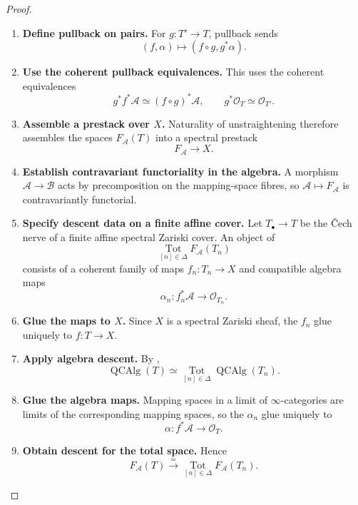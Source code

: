 \begin{proof}
\begin{enumerate}[label=\textup{(\arabic*)}]
    \item \textbf{Define pullback on pairs.}
    For \(g:T'\to T\), pullback sends
    \[
        (f,\alpha)
        \longmapsto
        (f\circ g,g^*\alpha).
    \]

    \item \textbf{Use the coherent pullback equivalences.}
    This uses the coherent equivalences
    \[
        g^*f^*\mathcal A\simeq(f\circ g)^*\mathcal A,
        \qquad
        g^*\mathcal O_T\simeq\mathcal O_{T'}.
    \]

    \item \textbf{Assemble a prestack over \(X\).}
    Naturality of unstraightening therefore assembles the spaces
    \(F_{\mathcal A}(T)\) into a spectral prestack
    \[
        F_{\mathcal A}\longrightarrow X.
    \]

    \item \textbf{Establish contravariant functoriality in the algebra.}
    A morphism \(\mathcal A\to\mathcal B\) acts by precomposition on the
    mapping-space fibres, so \(\mathcal A\mapsto F_{\mathcal A}\) is
    contravariantly functorial.

    \item \textbf{Specify descent data on a finite affine cover.}
    Let \(T_\bullet\to T\) be the \v{C}ech nerve of a finite affine spectral
    Zariski cover. An object of
    \[
        \operatorname*{Tot}_{[n]\in\Delta}F_{\mathcal A}(T_n)
    \]
    consists of a coherent family of maps \(f_n:T_n\to X\) and compatible
    algebra maps
    \[
        \alpha_n:f_n^*\mathcal A\longrightarrow\mathcal O_{T_n}.
    \]

    \item \textbf{Glue the maps to \(X\).}
    Since \(X\) is a spectral Zariski sheaf, the \(f_n\) glue uniquely to
    \(f:T\to X\).

    \item \textbf{Apply algebra descent.}
    By
    ,
    \[
        \operatorname{QCAlg}(T)
        \simeq
        \operatorname*{Tot}_{[n]\in\Delta}
        \operatorname{QCAlg}(T_n).
    \]

    \item \textbf{Glue the algebra maps.}
    Mapping spaces in a limit of \(\infty\)-categories are limits of the
    corresponding mapping spaces, so the \(\alpha_n\) glue uniquely to
    \[
        \alpha:f^*\mathcal A\longrightarrow\mathcal O_T.
    \]

    \item \textbf{Obtain descent for the total space.}
    Hence
    \[
        F_{\mathcal A}(T)
        \xrightarrow{\simeq}
        \operatorname*{Tot}_{[n]\in\Delta}F_{\mathcal A}(T_n).
    \]


\end{enumerate}
\end{proof}
